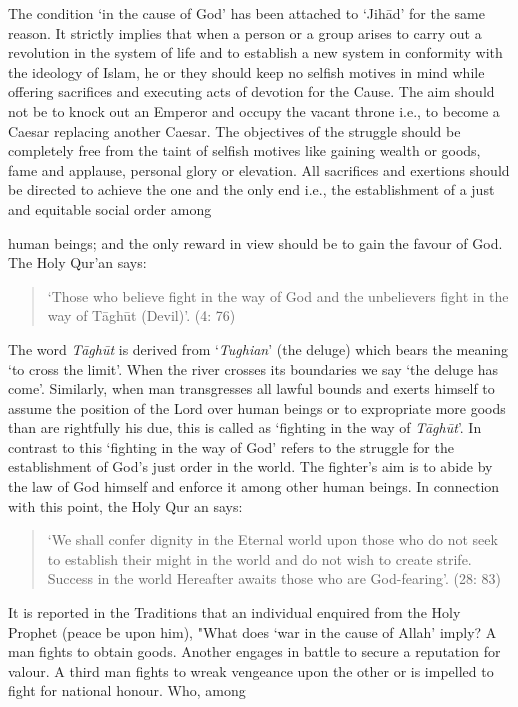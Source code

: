 The condition `in the cause of God' has been attached to `Jihād' for the
same reason. It strictly implies that when a person or a group arises to
carry out a revolution in the system of life and to establish a new
system in conformity with the ideology of Islam, he or they should keep
no selfish motives in mind while offering sacrifices and executing acts
of devotion for the Cause. The aim should not be to knock out an Emperor
and occupy the vacant throne i.e., to become a Caesar replacing another
Caesar. The objectives of the struggle should be completely free from
the taint of selfish motives like gaining wealth or goods, fame and
applause, personal glory or elevation. All sacrifices and exertions
should be directed to achieve the one and the only end i.e., the
establishment of a just and equitable social order among

human beings; and the only reward in view should be to gain the favour
of God. The Holy Qur'an says:

\begin{quote}
`Those who believe fight in the way of God and the unbelievers fight in
the way of Tāghūt (Devil)'. (4: 76)
\end{quote}

The word \emph{Tāghūt} is derived from `\emph{Tughian}' (the deluge)
which bears the meaning `to cross the limit'. When the river crosses its
boundaries we say `the deluge has come'. Similarly, when man
transgresses all lawful bounds and exerts himself to assume the position
of the Lord over human beings or to expropriate more goods than are
rightfully his due, this is called as `fighting in the way of
\emph{Tāghūt}'. In contrast to this `fighting in the way of God' refers
to the struggle for the establishment of God's just order in the world.
The fighter's aim is to abide by the law of God himself and enforce it
among other human beings. In connection with this point, the Holy Qur an
says:

\begin{quote}
`We shall confer dignity in the Eternal world upon those who do not seek
to establish their might in the world and do not wish to create strife.
Success in the world Hereafter awaits those who are God-fearing'. (28:
83)
\end{quote}

It is reported in the Traditions that an individual enquired from the
Holy Prophet (peace be upon him), "What does `war in the cause of Allah'
imply? A man fights to obtain goods. Another engages in battle to secure
a reputation for valour. A third man fights to wreak vengeance upon the
other or is impelled to fight for national honour. Who, among

